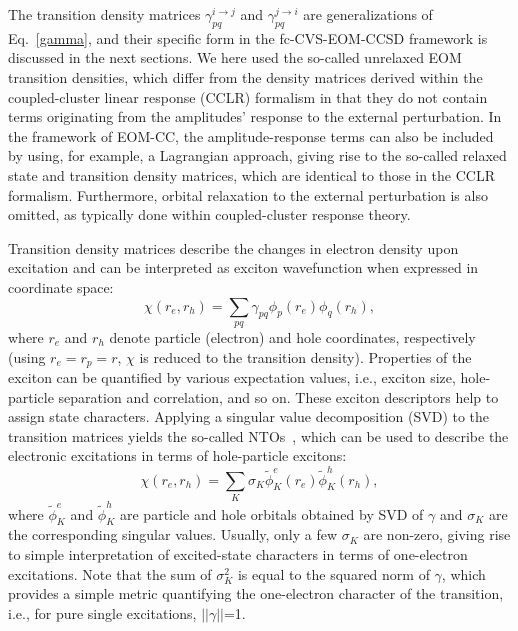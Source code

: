\documentclass[journal=jctcce,manuscript=article]{achemso}
\begin{document}
The transition density matrices $\gamma^{i\to j}_{pq}$ and $\gamma^{j\to i}_{pq}$ are generalizations of Eq.~\eqref{gamma}, and their specific form in the fc-CVS-EOM-CCSD framework is discussed in the next sections.
We here used the so-called unrelaxed EOM transition densities, which differ from the density matrices derived within the coupled-cluster linear response (CCLR)
formalism in that they do not contain terms originating from the amplitudes' response to the external perturbation.
In the framework of EOM-CC, the amplitude-response terms can also be included by using, for example, a Lagrangian approach, giving rise to the so-called relaxed state and transition
density matrices, which are identical to those in the CCLR formalism\cite{koch1990,Stanton:EOMGRAD:93,StantonGauss:EOMgrad:94,Stanton:94:AnlDer,sfccsdgrad,Nanda:EOMCCpoles:2018}.
Furthermore, orbital relaxation to the external perturbation is also omitted, as typically done within coupled-cluster response theory.~\cite{Christiansen_IJQC}

Transition density matrices describe  the changes in electron density upon excitation and can be interpreted as exciton wavefunction\cite{Luzanov:TDM-1:76,Luzanov:DMRev:12,Plasser2012,Plasser2014}
when expressed in coordinate space:
\begin{equation}
\chi(r_e,r_h) = \sum_{pq} \gamma_{pq} \phi_p(r_e) \phi_q(r_h),
\end{equation}
where $r_e$ and $r_h$ denote particle (electron) and hole coordinates,
respectively (using $r_e=r_p=r$, $\chi$ is reduced to the transition density).  
Properties of the exciton can be quantified by various expectation
values, i.e., exciton size, hole-particle separation and correlation, and so on.
These exciton descriptors help to assign state characters\cite{Plasser2012,Plasser2014,Plasser2014:1}.
Applying a singular value decomposition (SVD) to the transition matrices yields the so-called NTOs~\cite{Martin2003,Plasser2012,Plasser2014,Plasser2014:1,Bappler2014,Mewes2018}, which can be used to
describe the electronic excitations in terms of hole-particle excitons:
\begin{equation}
\chi(r_e,r_h) = \sum_K \sigma_K  \tilde{\phi}^e_K(r_e) \tilde{\phi}^h_K(r_h),
\end{equation}
where $\tilde \phi^e_K$ and $\tilde \phi^h_K$ are particle and hole orbitals obtained by SVD 
of $\gamma$ and $\sigma_K$  
are the corresponding  singular values. Usually, only a few
$\sigma_K$ are non-zero, giving rise to simple interpretation of excited-state characters
in terms of one-electron excitations. Note that the sum of $\sigma_K^2$ is equal to the squared norm of $\gamma$, which provides a simple metric quantifying the one-electron character of the transition, i.e., for pure single excitations, $||\gamma||$=1. 
\end{document}
